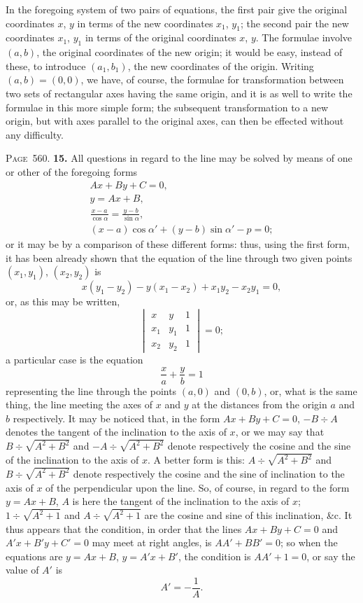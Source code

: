 \documentclass[11pt,a4paper]{article}
\theoremstyle{definition}
\begin{document}
In the foregoing system of two pairs of equations, the first pair give the original coordinates $x$, $y$ in terms of the new coordinates $x_1$, $y_1$; the second pair the new coordinates $x_1$, $y_1$ in terms of the original coordinates $x$, $y$. The formulae involve $(a,b)$, the original coordinates of the new origin; it would be easy, instead of these, to introduce $(a_1,b_1)$, the new coordinates of the origin. Writing $(a,b)=(0,0)$, we have, of course, the formulae for transformation between two sets of rectangular axes having the same origin, and it is as well to write the formulae in this more simple form; the subsequent transformation to a new origin, but with axes parallel to the original axes, can then be effected without any difficulty.

\newpage
\noindent\textsc{Page~560.} \textbf{15.} All questions in regard to the line may be solved by means of one or other of the foregoing forms
\begin{gather*}
Ax+By+C=0,\\
y=Ax+B,\\
\frac{x-a}{\cos\alpha} = \frac{y-b}{\sin\alpha},\\
(x-a)\cos\alpha' + (y-b)\sin\alpha' - p = 0;
\end{gather*}
or it may be by a comparison of these different forms: thus, using the first form, it has been already shown that the equation of the line through two given points $(x_1,y_1)$, $(x_2,y_2)$ is
\[
x(y_1-y_2)-y(x_1-x_2)+x_1y_2-x_2y_1=0,
\]
or, as this may be written,
\[
\begin{vmatrix} x & y & 1 \\ x_1 & y_1 & 1 \\ x_2 & y_2 & 1 \end{vmatrix} = 0;
\]
a particular case is the equation
\[
\frac{x}{a}+\frac{y}{b}=1
\]
representing the line through the points $(a,0)$ and $(0,b)$, or, what is the same thing, the line meeting the axes of $x$ and $y$ at the distances from the origin $a$ and $b$ respectively. It may be noticed that, in the form $Ax+By+C=0$, $-B\div A$ denotes the tangent of the inclination to the axis of $x$, or we may say that $B\div\sqrt{A^2+B^2}$ and $-A\div\sqrt{A^2+B^2}$ denote respectively the cosine and the sine of the inclination to the axis of $x$. A better form is this: $A\div\sqrt{A^2+B^2}$ and $B\div\sqrt{A^2+B^2}$ denote respectively the cosine and the sine of inclination to the axis of $x$ of the perpendicular upon the line. So, of course, in regard to the form $y=Ax+B$, $A$ is here the tangent of the inclination to the axis of $x$; $1\div\sqrt{A^2+1}$ and $A\div\sqrt{A^2+1}$ are the cosine and sine of this inclination, \&c. It thus appears that the condition, in order that the lines $Ax+By+C=0$ and $A'x+B'y+C'=0$ may meet at right angles, is $AA'+BB'=0$; so when the equations are $y=Ax+B$, $y=A'x+B'$, the condition is $AA'+1=0$, or say the value of $A'$ is
\[
A' = -\frac{1}{A}.
\]
\end{document}
